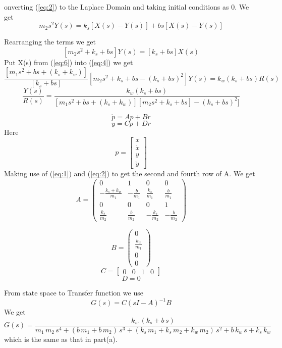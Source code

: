 \documentclass{article}
\newenvironment{answer}[2][Answer]{\begin{trivlist}
  \item[\hskip \labelsep {\bfseries #1}\hskip \labelsep {\bfseries #2:}]}{\end{trivlist}}
\begin{document}
\begin{answer}
  Converting (\ref{eq:2}) to the Laplace Domain and taking initial conditions as 0. We get
  \begin{equation}
    \label{eq:5}
    m_2s^2 Y(s) = k_s[X(s) - Y(s)] + bs[X(s) - Y(s)]
  \end{equation}
  
  Rearranging the terms we get
  \begin{equation}
    \label{eq:6}
    [m_2s^2 + k_s + bs]Y(s) = [k_s + bs]X(s)
  \end{equation}
  Put X(s) from (\ref{eq:6}) into (\ref{eq:4}) we get
  $$\frac{[m_1s^2 + bs + (k_s + k_w)]}{[k_s + bs]}[m_2s^2 + k_s + bs - (k_s + bs)^2]Y(s) = k_w(k_s+ bs)R(s)$$
  $$\frac{Y(s)}{R(s)} = \frac{ k_w(k_s+ bs)}{[m_1s^2 + bs + (k_s + k_w)][m_2s^2 + k_s + bs] - (k_s + bs)^2]}$$
\end{answer}

\begin{answer}b
  $$\dot{p} = Ap + Br$$
  $$y = Cp + Dr$$
  Here
  \[
    p = \begin{bmatrix}
      x \\
      \dot{x}\\
      y\\
      \dot{y}
    \end{bmatrix}
  \]
  Making use of (\ref{eq:1}) and (\ref{eq:2}) to get the second and fourth row of A. We get
  $$A = \left(\begin{array}{cccc} 0 & 1 & 0 & 0\\ -\frac{k_{s} + k_{w}}{m_{1}} & -\frac{b}{m_{1}} & \frac{k_{s}}{m_{1}} & \frac{b}{m_{1}}\\ 0 & 0 & 0 & 1\\ \frac{k_{s}}{m_{2}} & \frac{b}{m_{2}} & -\frac{k_{s}}{m_{2}} & -\frac{b}{m_{2}} \end{array}\right)$$
  
  $$B = \left(\begin{array}{c} 0\\ \frac{k_{w}}{m_{1}}\\ 0\\ 0 \end{array}\right)$$
  \[
    C =
    \begin{bmatrix}
      0 & 0 & 1 & 0
    \end{bmatrix}
  \]
  $$ D = 0$$
\end{answer}

\begin{answer}c
  From state space to Transfer function we use
  $$G(s) = C(sI - A)^{-1}B$$
  We get
  $$G(s) = \frac{k_{w}\, \left(k_{s} + b\, s\right)}{m_{1}\, m_{2}\, s^4 + \left(b\, m_{1} + b\, m_{2}\right)\, s^3 + \left(k_{s}\, m_{1} + k_{s}\, m_{2} + k_{w}\, m_{2}\right)\, s^2 + b\, k_{w}\, s + k_{s}\, k_{w}}$$
  which is the same as that in part(a).

\end{answer}
\end{document}
